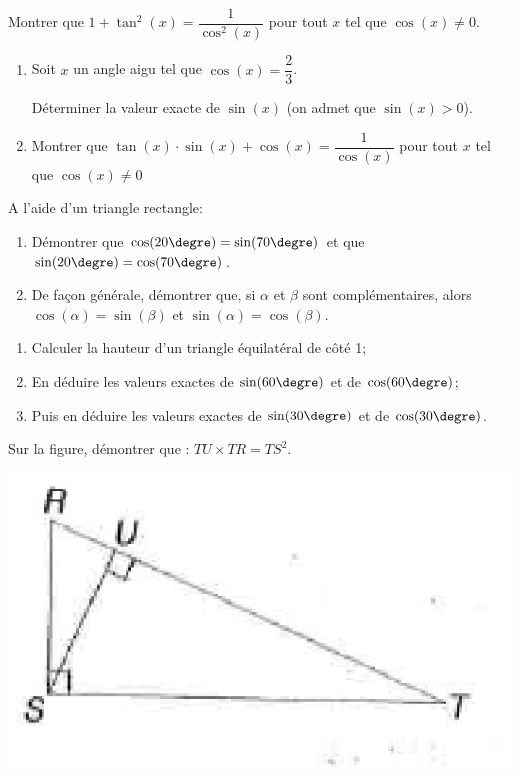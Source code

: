 \begin{exercice}
Montrer que $1+\tan^2(x)=\dfrac{1}{\cos^2(x)}$ pour tout $x$ tel que $\cos(x)\ne 0$.
\end{exercice}

\begin{exercice}
\begin{enumerate}
	\item Soit $x$ un angle aigu tel que $\cos(x)=\dfrac{2}{3}$.
	
	 Déterminer la valeur exacte de $\sin(x)$ (on admet que $\sin(x)>0$).
	\item Montrer que $\tan(x)\cdot\sin(x)+\cos(x)=\dfrac{1}{\cos(x)}$ pour tout $x$ tel que $\cos(x)\ne 0$
\end{enumerate}
\end{exercice}

\begin{exercice}
A l'aide d'un triangle rectangle:
\begin{enumerate}
	\item Démontrer que $\cos(20\textrm{\degre})=\sin(70\textrm{\degre})$ et que $\sin(20\textrm{\degre})=\cos(70\textrm{\degre})$.
	\item De façon générale, démontrer que, si $\alpha$ et $\beta$ sont complémentaires, alors $\cos(\alpha)=\sin(\beta)$ et $\sin(\alpha)=\cos(\beta)$.
\end{enumerate}
\end{exercice}

\begin{exercice}
\begin{enumerate}
	\item Calculer la hauteur d'un triangle équilatéral de côté 1;
		\item En déduire les valeurs exactes de $\sin(60\textrm{\degre})$ et de $\cos(60\textrm{\degre})$;
	\item Puis en déduire les valeurs exactes de $\sin(30\textrm{\degre})$ et de $\cos(30\textrm{\degre})$.

\end{enumerate}
\end{exercice}

\begin{exercice}
Sur la figure, démontrer que : $TU \times TR=TS^2$.
\begin{center}
\includegraphics[scale=0.6]{Trigonometrie/figures/triangle.eps}
\end{center}
\end{exercice}

